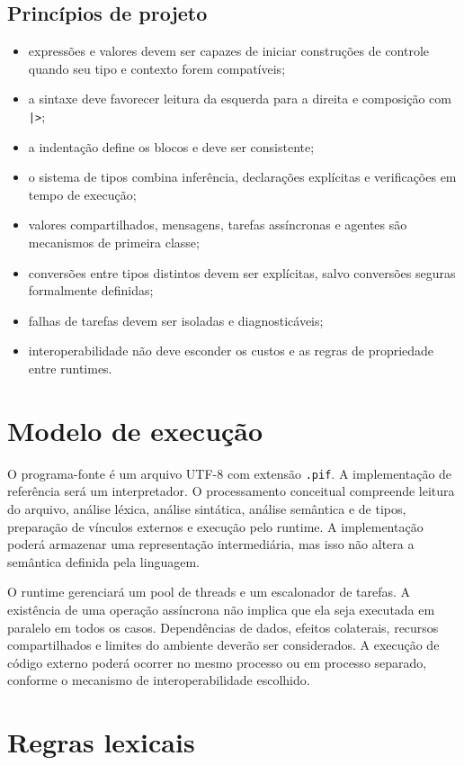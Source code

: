 \documentclass[12pt,a4paper]{article}
\begin{document}
\subsection{Princípios de projeto}
\begin{itemize}
\item expressões e valores devem ser capazes de iniciar construções de controle quando seu tipo e contexto forem compatíveis;
\item a sintaxe deve favorecer leitura da esquerda para a direita e composição com \texttt{|>};
\item a indentação define os blocos e deve ser consistente;
\item o sistema de tipos combina inferência, declarações explícitas e verificações em tempo de execução;
\item valores compartilhados, mensagens, tarefas assíncronas e agentes são mecanismos de primeira classe;
\item conversões entre tipos distintos devem ser explícitas, salvo conversões seguras formalmente definidas;
\item falhas de tarefas devem ser isoladas e diagnosticáveis;
\item interoperabilidade não deve esconder os custos e as regras de propriedade entre runtimes.
\end{itemize}

\section{Modelo de execução}
O programa-fonte é um arquivo UTF-8 com extensão \texttt{.pif}. A implementação de referência será um interpretador. O processamento conceitual compreende leitura do arquivo, análise léxica, análise sintática, análise semântica e de tipos, preparação de vínculos externos e execução pelo runtime. A implementação poderá armazenar uma representação intermediária, mas isso não altera a semântica definida pela linguagem.

O runtime gerenciará um pool de threads e um escalonador de tarefas. A existência de uma operação assíncrona não implica que ela seja executada em paralelo em todos os casos. Dependências de dados, efeitos colaterais, recursos compartilhados e limites do ambiente deverão ser considerados. A execução de código externo poderá ocorrer no mesmo processo ou em processo separado, conforme o mecanismo de interoperabilidade escolhido.

\section{Regras lexicais}
\end{document}
